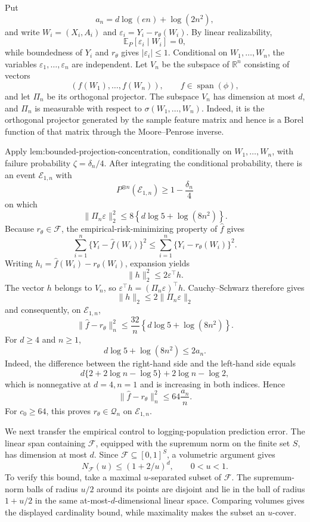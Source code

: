 Put
\[
a_n=d\log(en)+\log(2n^2),
\]
and write \(W_i=(X_i,A_i)\) and \(\varepsilon_i=Y_i-r_\theta(W_i)\). By linear realizability,
\[
\mathbb E_P[\varepsilon_i\mid W_i]=0,
\]
while boundedness of \(Y_i\) and \(r_\theta\) gives \(|\varepsilon_i|\le1\). Conditional on \(W_1,\ldots,W_n\), the variables \(\varepsilon_1,\ldots,\varepsilon_n\) are independent. Let \(V_n\) be the subspace of \(\mathbb R^n\) consisting of vectors
\[
(f(W_1),\ldots,f(W_n)),\qquad f\in\operatorname{span}(\phi),
\]
and let \(\Pi_n\) be its orthogonal projector. The subspace \(V_n\) has dimension at most \(d\), and \(\Pi_n\) is measurable with respect to \(\sigma(W_1,\ldots,W_n)\). Indeed, it is the orthogonal projector generated by the sample feature matrix and hence is a Borel function of that matrix through the Moore--Penrose inverse.

Apply \(\text{lem:bounded-projection-concentration}\), conditionally on \(W_1,\ldots,W_n\), with failure probability \(\zeta=\delta_n/4\). After integrating the conditional probability, there is an event \(\mathcal E_{1,n}\) with
\[
P^{\otimes n}(\mathcal E_{1,n})\ge1-\frac{\delta_n}{4}
\]
on which
\[
\|\Pi_n\varepsilon\|_2^2
\le8\left\{d\log5+\log(8n^2)\right\}.
\]
Because \(r_\theta\in\mathcal F\), the empirical-risk-minimizing property of \(\widehat f\) gives
\[
\sum_{i=1}^n\{Y_i-\widehat f(W_i)\}^2
\le
\sum_{i=1}^n\{Y_i-r_\theta(W_i)\}^2.
\]
Writing \(h_i=\widehat f(W_i)-r_\theta(W_i)\), expansion yields
\[
\|h\|_2^2\le2\varepsilon^\top h.
\]
The vector \(h\) belongs to \(V_n\), so \(\varepsilon^\top h=(\Pi_n\varepsilon)^\top h\). Cauchy--Schwarz therefore gives
\[
\|h\|_2\le2\|\Pi_n\varepsilon\|_2
\]
and consequently, on \(\mathcal E_{1,n}\),
\[
\|\widehat f-r_\theta\|_n^2
\le
\frac{32}{n}\left\{d\log5+\log(8n^2)\right\}.
\]
For \(d\ge4\) and \(n\ge1\),
\[
d\log5+\log(8n^2)\le2a_n.
\]
Indeed, the difference between the right-hand side and the left-hand side equals
\[
d\{2+2\log n-\log5\}+2\log n-\log2,
\]
which is nonnegative at \(d=4,n=1\) and is increasing in both indices. Hence
\[
\|\widehat f-r_\theta\|_n^2\le64\frac{a_n}{n}.
\]
For \(c_0\ge64\), this proves \(r_\theta\in\mathcal Q_n\) on \(\mathcal E_{1,n}\).

We next transfer the empirical control to logging-population prediction error. The linear span containing \(\mathcal F\), equipped with the supremum norm on the finite set \(S\), has dimension at most \(d\). Since \(\mathcal F\subseteq[0,1]^S\), a volumetric argument gives
\[
N_{\mathcal F}(u)\le(1+2/u)^d,\qquad 0<u<1.
\]
To verify this bound, take a maximal \(u\)-separated subset of \(\mathcal F\). The supremum-norm balls of radius \(u/2\) around its points are disjoint and lie in the ball of radius \(1+u/2\) in the same at-most-\(d\)-dimensional linear space. Comparing volumes gives the displayed cardinality bound, while maximality makes the subset an \(u\)-cover.

